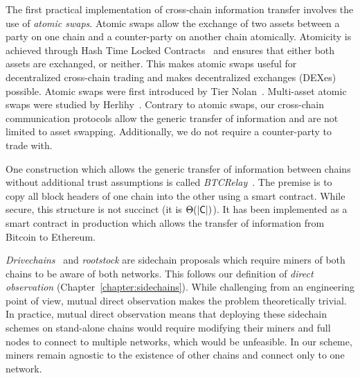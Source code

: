 The first practical implementation of cross-chain information transfer involves
the use of \emph{atomic swaps}. Atomic swaps allow the exchange of two assets
between a party on one chain and a counter-party on another chain atomically.
Atomicity is achieved through Hash Time Locked Contracts~\cite{lightning} and
ensures that either both assets are exchanged, or neither. This makes atomic
swaps useful for decentralized cross-chain trading and makes decentralized
exchanges (DEXes) possible. Atomic swaps were first introduced by Tier
Nolan~\cite{tiernolan}. Multi-asset atomic swaps were studied by
Herlihy~\cite{herlihy2018atomic}. Contrary to atomic swaps, our cross-chain
communication protocols allow the generic transfer of information and are not
limited to asset swapping. Additionally, we do not require a counter-party to
trade with.

One construction which allows the generic transfer of information between chains
without additional trust assumptions is called \emph{BTCRelay}~\cite{btcrelay}.
The premise is to copy all block headers of one chain into the other using a
smart contract. While secure, this structure is not succinct (it is
$\Theta(|\mathsf{C}|)$). It has been implemented as a smart contract in production
which allows the transfer of information from Bitcoin to Ethereum.

\emph{Drivechains}~\cite{drivechains,lerner} and \emph{rootstock} are sidechain proposals which require
miners of both chains to be aware of both networks. This follows our definition
of \emph{direct observation} (Chapter~\ref{chapter:sidechains}). While
challenging from an engineering point of view, mutual direct observation makes
the problem theoretically trivial. In practice, mutual direct observation means
that deploying these sidechain schemes on stand-alone chains would require
modifying their miners and full nodes to connect to multiple networks, which
would be unfeasible. In our scheme, miners remain agnostic to the
existence of other chains and connect only to one network.

